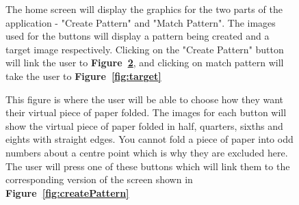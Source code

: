 \documentclass[11pt]{article}
\begin{document}
\begin{figure}
                \begin{minipage}[c]{0.65\textwidth}
                \caption{The home screen will display the graphics for the two parts of the application - "Create Pattern" and "Match Pattern". The images used for the buttons will display a pattern being created and a target image respectively. Clicking on the "Create Pattern" button will link the user to \textbf{Figure~\ref{fig:chooseFold}}, and clicking on match pattern will take the user to  \textbf{Figure~\ref{fig:target}}}
                \label{fig:homeScreen}
                \end{minipage}
            \end{figure}
            \begin{figure}
                \begin{minipage}[c]{0.65\textwidth}
                \caption{This figure is where the user will be able to choose how they want their virtual piece of paper folded. The images for each button will show the virtual piece of paper folded in half, quarters, sixths and eights with straight edges. You cannot fold a piece of paper into odd numbers about a centre point which is why they are excluded here. The user will press one of these buttons which will link them to the corresponding version of the screen shown in \textbf{Figure~\ref{fig:createPattern}}}
                \label{fig:chooseFold}
                \end{minipage}\hfill
                \begin{minipage}[c]{0.35\textwidth}

\end{minipage}
\end{figure}
\end{document}

